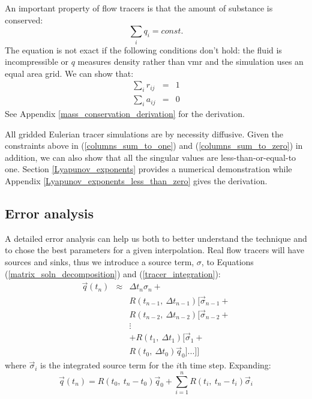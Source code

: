 \documentclass{article}
\begin{document}
An important property of flow tracers is that the amount of substance is 
conserved:
\begin{equation}
\sum_i q_i = const.
\end{equation}
The equation is not exact if the following conditions don't hold:
the fluid is incompressible or $q$ measures
density rather than vmr and the simulation uses an equal area grid. 
We can show that:
\begin{eqnarray}
\sum_i r_{ij} & = & 1 
\label{columns_sum_to_one}\\
\sum_i a_{ij} & = & 0
\label{columns_sum_to_zero}
\end{eqnarray}
See Appendix \ref{mass_conservation_derivation} for the derivation.

All gridded Eulerian tracer simulations are by necessity diffusive. 
Given the constraints above in (\ref{columns_sum_to_one}) and
(\ref{columns_sum_to_zero}) in addition, 
we can also show that all the singular values are less-than-or-equal-to one.
Section \ref{Lyapunov_exponents} provides a numerical demonstration while 
Appendix \ref{Lyapunov_exponents_less_than_zero} gives the derivation.

\subsection{Error analysis}

A detailed error analysis can help us both to better understand the technique
and to chose the best parameters for a given interpolation.
Real flow tracers will have sources and sinks, thus we introduce a source
term, $\sigma$, to Equations (\ref{matrix_soln_decomposition})
and (\ref{tracer_integration}):
\begin{eqnarray}
	  \vec q(t_n) 
  & \approx & \Delta t_{n} \sigma_{n} + \nonumber \\
  & & R(t_{n-1}, ~ \Delta t_{n-1}) [\vec \sigma_{n-1} + \nonumber \\
  & & R(t_{n-2}, ~ \Delta t_{n-2}) [\vec \sigma_{n-2} + \nonumber \\
  & & \vdots \nonumber \\
  & & + R(t_1, ~ \Delta t_1) [\vec \sigma_1 + \nonumber \\
  & & R(t_0, ~ \Delta t_0) \vec q_0 ]...]]
\end{eqnarray}
where $\vec \sigma_i$ is the integrated source term for the $i$th time step.
Expanding:
\begin{equation}
\vec q(t_n) 
   = R(t_0,~t_n-t_0) \vec q_0 + \sum_{i=1}^{n} R(t_i,~t_n-t_i) \vec \sigma_i
  \label{sources_sinks}
\end{equation}
\end{document}
